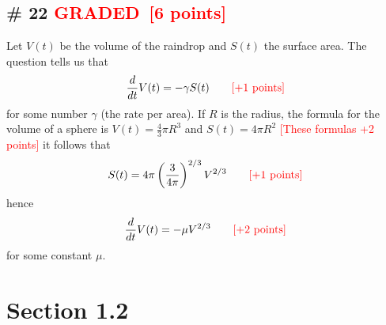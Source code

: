 \documentclass[12pt,letterpaper]{exam}
\newcommand{\grade}{\textcolor{red}{GRADED}}
\newcommand{\pts}[1]{\textcolor{red}{[#1]}}
\begin{document}
\subsection*{\# 22 \grade \, \pts{6 points}}

Let $V(t)$ be the volume of the raindrop and $S(t)$ the surface area. The question tells us that 
\begin{equation}
\frac{d}{dt}V(t) = - \gamma S(t)\quad\quad \text{\pts{+1 points}}
\end{equation}
for some number $\gamma$ (the rate per area). If $R$ is the radius, the formula for the volume of a sphere is $V(t) = \frac{4}{3}\pi R^3$ and $S(t) = 4\pi R^2$ \pts{These formulas +2 points} it follows that 
\begin{equation}
S(t) = 4 \pi \left( \frac{3}{4\pi} \right)^{2/3}V^{2/3}  \quad\quad \text{\pts{+1 points}}
\end{equation}
hence 
\begin{equation}
\frac{d}{dt}V(t) = - \mu V^{2/3}  \quad\quad \text{\pts{+2 points}}
\end{equation}
for some constant $\mu$. 


\section*{Section 1.2}

\end{document}
